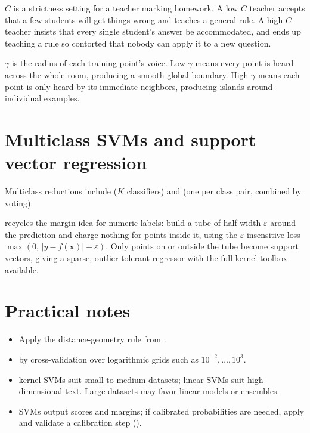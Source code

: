 \begin{analogy}
$C$ is a strictness setting for a teacher marking homework. A low $C$ teacher accepts that a few students will get things wrong and teaches a general rule. A high $C$ teacher insists that every single student's answer be accommodated, and ends up teaching a rule so contorted that nobody can apply it to a new question.

$\gamma$ is the radius of each training point's voice. Low $\gamma$ means every point is heard across the whole room, producing a smooth global boundary. High $\gamma$ means each point is only heard by its immediate neighbors, producing islands around individual examples.
\end{analogy}

\section{Multiclass SVMs and support vector regression}

Multiclass reductions include  ($K$ classifiers) and  (one per class pair, combined by voting).

 recycles the margin idea for numeric labels: build a tube of half-width $\varepsilon$ around the prediction and charge nothing for points inside it, using the $\varepsilon$-insensitive loss $\max(0,\,|y-f(\bm{x})|-\varepsilon)$. Only points on or outside the tube become support vectors, giving a sparse, outlier-tolerant regressor with the full kernel toolbox available.

\section{Practical notes}

\begin{itemize}
  \item {} Apply the distance-geometry rule from .
  \item {} by cross-validation over logarithmic grids such as $10^{-2},\ldots,10^{3}$.
  \item {} kernel SVMs suit small-to-medium datasets; linear SVMs suit high-dimensional text. Large datasets may favor linear models or ensembles.
  \item {} SVMs output scores and margins; if calibrated probabilities are needed, apply and validate a calibration step ().
\end{itemize}

